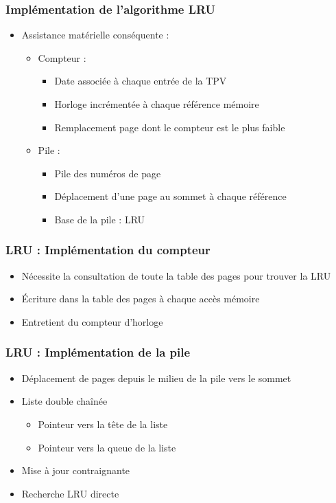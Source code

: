 \begin{frame}
\frametitle{Implémentation de l'algorithme LRU}
\begin{itemize}
\item Assistance matérielle conséquente :
\begin{itemize}
\item Compteur :
\begin{itemize}
\item Date associée à chaque entrée de la TPV
\item Horloge incrémentée à chaque référence mémoire
\item Remplacement page dont le compteur est le plus faible
\end{itemize}
\item Pile :
\begin{itemize}
\item Pile des numéros de page
\item Déplacement d'une page au sommet à chaque référence
\item Base de la pile : LRU
\end{itemize}
\end{itemize}
\end{itemize}
\end{frame}


\begin{frame}
\frametitle{LRU : Implémentation du compteur}
\begin{itemize}
\item Nécessite la consultation de toute la table des pages pour trouver la LRU
\item Écriture dans la table des pages à chaque accès mémoire
\item Entretient du compteur d'horloge
\end{itemize}
\end{frame}


\begin{frame}
\frametitle{LRU : Implémentation de la pile}
\begin{itemize}
\item Déplacement de pages depuis le milieu de la pile vers le sommet
\item Liste double chaînée
\begin{itemize}
\item Pointeur vers la tête de la liste
\item Pointeur vers la queue de la liste
\end{itemize}
\item Mise à jour contraignante
\item Recherche LRU directe
\end{itemize}
\end{frame}


